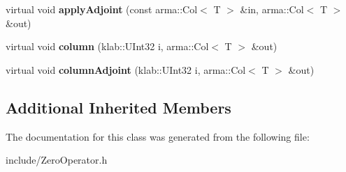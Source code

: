 \begin{DoxyCompactItemize}
\item 
virtual void {\bfseries apply\+Adjoint} (const arma\+::\+Col$<$ T $>$ \&in, arma\+::\+Col$<$ T $>$ \&out)\hypertarget{classkl1p_1_1TZeroOperator_a6554b15dc1386a5f992f5b79b57d78d3}{}\label{classkl1p_1_1TZeroOperator_a6554b15dc1386a5f992f5b79b57d78d3}

\item 
virtual void {\bfseries column} (klab\+::\+U\+Int32 i, arma\+::\+Col$<$ T $>$ \&out)\hypertarget{classkl1p_1_1TZeroOperator_a3f088279344b4b9b0a5725eb78dada4f}{}\label{classkl1p_1_1TZeroOperator_a3f088279344b4b9b0a5725eb78dada4f}

\item 
virtual void {\bfseries column\+Adjoint} (klab\+::\+U\+Int32 i, arma\+::\+Col$<$ T $>$ \&out)\hypertarget{classkl1p_1_1TZeroOperator_ae7fc57d5b55f1d3f690a5146d90cfc42}{}\label{classkl1p_1_1TZeroOperator_ae7fc57d5b55f1d3f690a5146d90cfc42}

\end{DoxyCompactItemize}
\subsection*{Additional Inherited Members}


The documentation for this class was generated from the following file\+:\begin{DoxyCompactItemize}
\item 
include/Zero\+Operator.\+h\end{DoxyCompactItemize}
